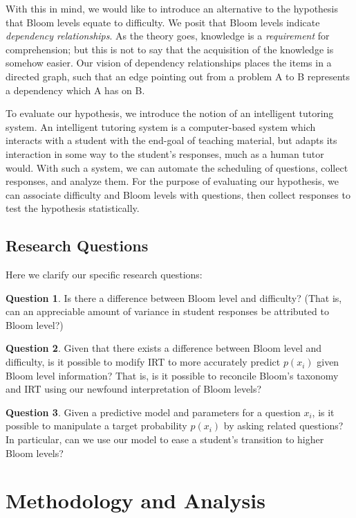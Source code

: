 \documentclass[a4paper,twocolumn]{article}
\begin{document}
With this in mind, we would like to introduce an alternative to the hypothesis
that Bloom levels equate to difficulty.  We posit that Bloom levels indicate
\emph{dependency relationships}.  As the theory goes, knowledge is a
\emph{requirement} for comprehension; but this is not to say that the
acquisition of the knowledge is somehow easier.  Our vision of dependency
relationships places the items in a directed graph, such that an edge pointing
out from a problem A to B represents a dependency which A has on B.

To evaluate our hypothesis, we introduce the notion of an intelligent tutoring
system.  An intelligent tutoring system is a computer-based system which
interacts with a student with the end-goal of teaching material, but adapts its
interaction in some way to the student's responses, much as a human tutor
would.  With such a system, we can automate the scheduling of questions,
collect responses, and analyze them. For the purpose of evaluating our
hypothesis, we can associate difficulty and Bloom levels with questions, then
collect responses to test the hypothesis statistically.

\subsection{Research Questions}

Here we clarify our specific research questions:

\textbf{Question 1}. Is there a difference between Bloom level and difficulty?
(That is, can an appreciable amount of variance in student responses be
attributed to Bloom level?)

\textbf{Question 2}. Given that there exists a difference between Bloom level
and difficulty, is it possible to modify IRT to more accurately predict
$p(x_i)$ given Bloom level information?  That is, is it possible to reconcile
Bloom's taxonomy and IRT using our newfound interpretation of Bloom levels?

\textbf{Question 3}. Given a predictive model and parameters for a question
$x_i$, is it possible to manipulate a target probability $p(x_i)$ by asking
related questions?  In particular, can we use our model to ease a student's
transition to higher Bloom levels?

\section{Methodology and Analysis}
\end{document}
